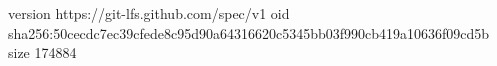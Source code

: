 version https://git-lfs.github.com/spec/v1
oid sha256:50cecdc7ec39cfede8c95d90a64316620c5345bb03f990cb419a10636f09cd5b
size 174884
